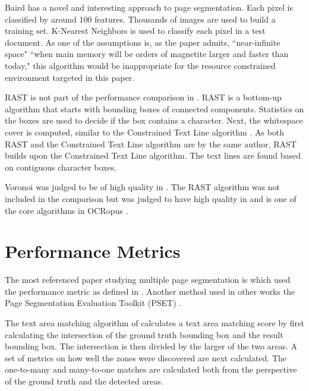 \documentclass[conference]{IEEEtran}
\begin{document}
Baird \cite{baird2006versatile} has a novel and interesting approach to page
segmentation. Each pixel is classified by around 100 features. Thousands of
images are used to build a training set. K-Nearest Neighbors is used
to classify each pixel in a test document. As one of the assumptions
is, as the paper admits, ``near-infinite space" ``when main memory will
be orders of magnetite larger and faster than today," this algorithm
would be inappropriate for the resource constrained environment
targeted in this paper.

RAST is not part of the performance comparison in \cite{shafait2006performance,mao2000empirical}. 
RAST is a bottom-up algorithm that starts with bounding boxes of connected
components. Statistics on the boxes are used to decide if the box contains a
character. Next, the whitespace cover is computed, similar to the Constrained
Text Line algorithm \cite{breuel2002two}.  As both RAST and the Constrained
Text Line algorithm are by the same author, RAST builds upon the Constrained
Text Line algorithm. The text lines are found based on contiguous character
boxes.

Voronoi was judged to be of high quality in \cite{shafait2006performance}. The
RAST algorithm was not included in the \cite{shafait2006performance} comparison
but was judged to have high quality in \cite{winder2010extending} and is one of
the core algorithms in OCRopus \cite{breuel2008ocropus}. 


\section{Performance Metrics}
The most referenced paper studying multiple page segmentation is
\cite{shafait2006performance} which used the performance metric as defined in
\cite{phillips1999empirical}. Another method used in other works the Page Segmentation
Evaluation Toolkit (PSET) \cite{mao2000pset,mao2002software}.

The text area matching algorithm of \cite{phillips1999empirical} calculates a
text area matching score by first calculating the intersection of the ground
truth bounding box and the result bounding box. The intersection is
then divided by the larger of the two areas. A set of metrics on how well the
zones were discovered are next calculated.  The one-to-many and many-to-one
matches are calculated both from the perspective of the ground truth and the
detected areas. 
\end{document}
